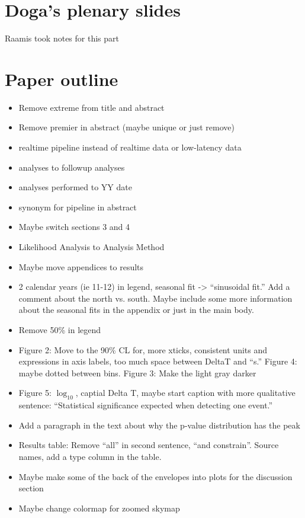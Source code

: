 \section{Doga's plenary slides}
Raamis took notes for this part

\section{Paper outline}
\begin{itemize}
    \item Remove extreme from title and abstract
    \item Remove premier in abstract (maybe unique or just remove)
    \item realtime pipeline instead of realtime data or low-latency data
    \item analyses to followup analyses
    \item analyses performed to YY date
    \item synonym for pipeline in abstract
    \item Maybe switch sections 3 and 4
    \item Likelihood Analysis to Analysis Method
    \item Maybe move appendices to results
    \item 2 calendar years (ie 11-12) in legend, seasonal fit -> ``sinusoidal fit.'' Add a comment about the north vs. south. Maybe include some more information about the seasonal fits in the appendix or just in the main body.
    \item Remove 50\% in legend
    \item Figure 2: Move to the 90\% CL for, more xticks, consistent units and expressions in axis labels, too much space between DeltaT and ``s.'' Figure 4: maybe dotted between bins. Figure 3: Make the light gray darker
    \item Figure 5: $\log_{10}$, captial Delta T, maybe start caption with more qualitative sentence: ``Statistical significance expected when detecting one event.''
    \item Add a paragraph in the text about why the p-value distribution has the peak
    \item Results table: Remove ``all'' in second sentence, ``and constrain''. Source names, add a type column in the table.
    \item Maybe make some of the back of the envelopes into plots for the discussion section
    \item Maybe change colormap for zoomed skymap
\end{itemize}

